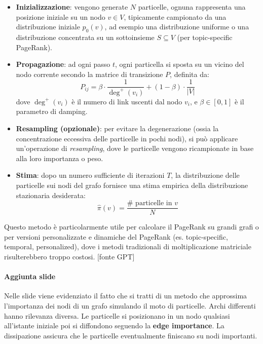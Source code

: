\begin{itemize}
    \item \textbf{Inizializzazione}: vengono generate \( N \) particelle, ognuna rappresenta una posizione iniziale su un nodo \( v \in V \), tipicamente campionato da una distribuzione iniziale \( p_0(v) \), ad esempio una distribuzione uniforme o una distribuzione concentrata su un sottoinsieme \( S \subseteq V \) (per topic-specific PageRank).
    
    \item \textbf{Propagazione}: ad ogni passo \( t \), ogni particella si sposta su un vicino del nodo corrente secondo la matrice di transizione \( P \), definita da:
    \[
        P_{ij} = \beta \cdot \frac{1}{\deg^+(v_i)} + (1 - \beta) \cdot \frac{1}{|V|}
    \]
    dove \( \deg^+(v_i) \) è il numero di link uscenti dal nodo \( v_i \), e \( \beta \in [0,1] \) è il parametro di damping.
    
    \item \textbf{Resampling (opzionale)}: per evitare la degenerazione (ossia la concentrazione eccessiva delle particelle in pochi nodi), si può applicare un'operazione di \textit{resampling}, dove le particelle vengono ricampionate in base alla loro importanza o peso.
    
    \item \textbf{Stima}: dopo un numero sufficiente di iterazioni \( T \), la distribuzione delle particelle sui nodi del grafo fornisce una stima empirica della distribuzione stazionaria desiderata:
    \[
        \hat{\pi}(v) = \frac{\# \text{ particelle in } v}{N}
    \]
\end{itemize}

Questo metodo è particolarmente utile per calcolare il PageRank su grandi grafi o per versioni personalizzate e dinamiche del PageRank (es. topic-specific, temporal, personalized), dove i metodi tradizionali di moltiplicazione matriciale risulterebbero troppo costosi. [fonte GPT]

\paragraph{Aggiunta slide} Nelle slide viene evidenziato il fatto che si tratti di un metodo che approssima l'importanza dei nodi di un grafo simulando il moto di particelle. Archi differenti hanno rilevanza diversa. Le particelle si posizionano in un nodo qualsiasi all'istante iniziale poi si diffondono seguendo la \textbf{edge importance}. La dissipazione assicura che le particelle eventualmente finiscano su nodi importanti. 